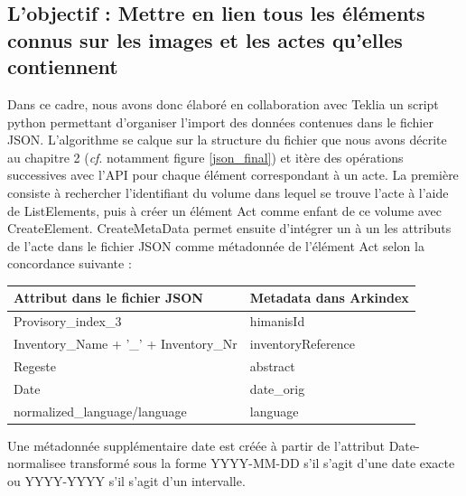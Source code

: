 \documentclass[a4paper,12pt,twoside]{book}
\begin{document}
	\subsection{L’objectif : Mettre en lien tous les éléments connus sur les images et les actes qu'elles contiennent}
	
	Dans ce cadre, nous avons donc élaboré en collaboration avec Teklia un script python permettant d'organiser l'import des données contenues dans le fichier JSON. L'algorithme se calque sur la structure du fichier que nous avons décrite au chapitre 2 (\textit{cf}. notamment figure \ref{json_final}) et itère des opérations successives avec l'API pour chaque élément correspondant à un acte. La première consiste à rechercher l'identifiant du volume dans lequel se trouve l'acte à l'aide de ListElements, puis à créer un élément Act comme enfant de ce volume avec CreateElement. CreateMetaData permet ensuite d'intégrer un à un les attributs de l'acte dans le fichier JSON comme métadonnée de l'élément Act selon la concordance suivante :
	
	\begin{center}
		\begin{tabular}{|p{8cm}|p{8cm}|}
			\hline
			Attribut dans le fichier JSON & Metadata dans Arkindex\\
			\hline\hline
			Provisory\_index\_3 & himanisId \\ \hline
			Inventory\_Name + '\_' + Inventory\_Nr & inventoryReference \\ \hline
			Regeste & abstract \\ \hline
			Date & date\_orig \\ \hline
			normalized\_language/language & language \\ \hline
		\end{tabular}
	\end{center}

	\noindent Une métadonnée supplémentaire \og date\fg{} est créée à partir de l'attribut \og Date-normalisee\fg{} transformé sous la forme YYYY-MM-DD s'il s'agit d'une date exacte ou YYYY-YYYY s'il s'agit d'un intervalle.
	
\end{document}
